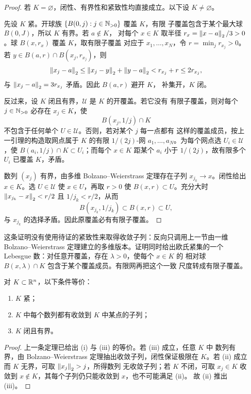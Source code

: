 \begin{proof}
若 \(K=\varnothing\)，闭性、有界性和紧致性均直接成立。以下设
\(K\ne\varnothing\)。

先设 \(K\) 紧。开球族 \(\{B(0,j):j\in\mathbb{N}_{>0}\}\) 覆盖 \(K\)，有限
子覆盖包含于某个最大球 \(B(0,J)\)，所以 \(K\) 有界。若 \(a\notin K\)，
对每个 \(x\in K\) 取半径
\(r_x=\left\lVert x-a\right\rVert_2/3>0\)。球 \(B(x,r_x)\) 覆盖 \(K\)，取有限子覆盖
对应于 \(x_1,\ldots,x_N\)，令 \(r=\min_jr_{x_j}>0\)。若
\(y\in B(a,r)\cap B(x_j,r_{x_j})\)，则
\[
 \left\lVert x_j-a\right\rVert_2
 \le\left\lVert x_j-y\right\rVert_2+\left\lVert y-a\right\rVert_2
 <r_{x_j}+r\le2r_{x_j},
\]
与 \(\left\lVert x_j-a\right\rVert_2=3r_{x_j}\) 矛盾。因此 \(B(a,r)\) 避开 \(K\)，
补集开，\(K\) 闭。

反过来，设 \(K\) 闭且有界，\(\mathcal U\) 是 \(K\) 的开覆盖。若它没有
有限子覆盖，则对每个 \(j\in\mathbb{N}_{>0}\) 必存在 \(x_j\in K\)，使
\[
 B(x_j,1/j)\cap K
\]
不包含于任何单个 \(U\in\mathcal U\)。否则，若对某个 \(j\) 每一点都有
这样的覆盖成员，按上一引理的构造取网点属于 \(K\) 的有限 \(1/(2j)\)-网
\(a_1,\ldots,a_N\)。为每个网点选 \(U_i\in\mathcal U\)，使
\(B(a_i,1/j)\cap K\subset U_i\)；而每个 \(x\in K\) 距某个 \(a_i\)
小于 \(1/(2j)\)，故有限多个 \(U_i\) 已覆盖 \(K\)，矛盾。

数列 \((x_j)\) 有界，由多维 Bolzano--Weierstrass 定理存在子列
\(x_{j_k}\to x\)。闭性给出 \(x\in K\)。选 \(U\in\mathcal U\) 使
\(x\in U\)，再取 \(r>0\) 使 \(B(x,r)\subset U\)。充分大时
\(\left\lVert x_{j_k}-x\right\rVert_2<r/2\) 且 \(1/j_k<r/2\)，从而
\[
 B(x_{j_k},1/j_k)\subset B(x,r)\subset U,
\]
与 \(x_{j_k}\) 的选择矛盾。因此原覆盖必有有限子覆盖。
\end{proof}

这条证明没有使用待证的紧致性来取得收敛子列：反向只调用上一节由一维
Bolzano--Weierstrass 定理建立的多维版本。证明同时给出欧氏紧集的一个
Lebesgue 数：对任意开覆盖，存在 \(\lambda>0\)，使每个 \(x\in K\) 的
相对球 \(B(x,\lambda)\cap K\) 包含于某个覆盖成员。有限网再把这个一致
尺度转成有限子覆盖。

\begin{theorem}[欧氏空间中的序列紧致性]
\label{thm:euclidean-sequential-compactness}
对 \(K\subset\mathbb{R}^n\)，以下条件等价：
\begin{enumerate}[label=\textup{(\roman*)}]
 \item \(K\) 紧；
 \item \(K\) 中每个数列都有收敛到 \(K\) 中某点的子列；
 \item \(K\) 闭且有界。
\end{enumerate}
\end{theorem}

\begin{proof}
上一条定理已给出 (i) 与 (iii) 的等价。若 (iii) 成立，任意 \(K\) 中
数列有界，由 Bolzano--Weierstrass 定理抽出收敛子列，闭性保证极限在
\(K\)。若 (ii) 成立而 \(K\) 无界，可取 \(\left\lVert x_j\right\rVert_2>j\)，所得数列
无收敛子列；若 \(K\) 不闭，可取 \(x_j\in K\) 收敛到
\(x\notin K\)，其每个子列仍只能收敛到 \(x\)，也不可能满足 (ii)。
故 (ii) 推出 (iii)。
\end{proof}

